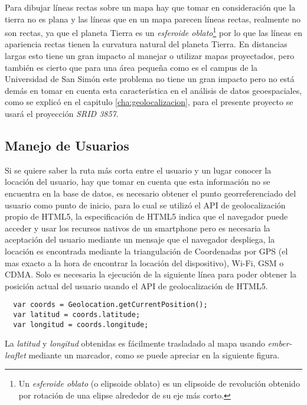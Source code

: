 Para dibujar líneas rectas sobre un mapa hay que tomar en consideración que la tierra no es plana y las líneas que en un mapa parecen líneas rectas, realmente no son rectas, ya que el planeta Tierra es un \emph{esferoide oblato}\footnote{Un \emph{esferoide oblato} (o elipsoide oblato) es un elipsoide de revolución obtenido por rotación de una elipse alrededor de su eje más corto.} por lo que las líneas en apariencia rectas tienen la curvatura natural del planeta Tierra. En distancias largas esto tiene un gran impacto al manejar o utilizar mapas proyectados, pero también es cierto que para una área pequeña como es el campus de la Universidad de San Simón este problema no tiene un gran impacto pero no está demás en tomar en cuenta esta característica en el análisis de datos geoespaciales, como se explicó en el capitulo \ref{cha:geolocalizacion}, para el presente proyecto se usará el proyección \emph{SRID 3857}.\\


\subsection{Manejo de Usuarios}
\label{sub:Manejo de Usuarios}

Si se quiere saber la ruta más corta entre el usuario y un lugar conocer la locación del usuario, hay que tomar en cuenta que esta información no se encuentra en la base de datos, es necesario obtener el punto georreferenciado del usuario como punto de inicio, para lo cual se utilizó el API de geolocalización propio de HTML5, la especificación de HTML5 indica que el navegador puede acceder y usar los recursos nativos de un smartphone pero es necesaria la aceptación del usuario mediante un mensaje que el navegador despliega, la locación es encontrada mediante la triangulación de Coordenadas por GPS (el mas exacto a la hora de encontrar la locación del dispositivo), Wi-Fi, GSM o CDMA. Solo es necesaria la ejecución de la siguiente línea para poder obtener la posición actual del usuario usando el API de geolocalización de HTML5. \\

\begin{verbatim}
  var coords = Geolocation.getCurrentPosition();
  var latitud = coords.latitude;
  var longitud = coords.longitude;
\end{verbatim}

La \emph{latitud} y \emph{longitud} obtenidas es fácilmente trasladado al mapa usando \emph{ember-leaflet} mediante un marcador, como se puede apreciar en la siguiente figura.


